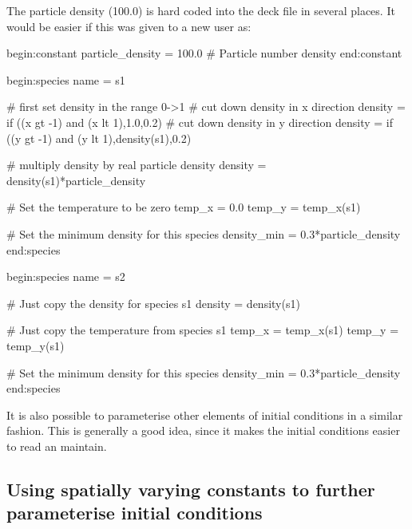The particle density (100.0) is hard coded into the deck file in several
places. It would be easier if this was given to a new user as:
\begin{boxverbatim}
begin:constant
   particle_density = 100.0 # Particle number density
end:constant

begin:species
   name = s1

   # first set density in the range 0->1
   # cut down density in x direction
   density = if ((x gt -1) and (x lt 1),1.0,0.2)
   # cut down density in y direction
   density = if ((y gt -1) and (y lt 1),density(s1),0.2)

   # multiply density by real particle density
   density = density(s1)*particle_density

   # Set the temperature to be zero
   temp_x = 0.0
   temp_y = temp_x(s1)

   # Set the minimum density for this species
   density_min = 0.3*particle_density
end:species

begin:species
   name = s2

   # Just copy the density for species s1
   density = density(s1)

   # Just copy the temperature from species s1
   temp_x = temp_x(s1)
   temp_y = temp_y(s1)

   # Set the minimum density for this species
   density_min = 0.3*particle_density
end:species
\end{boxverbatim}

It is also possible to parameterise other elements of initial conditions in a
similar fashion. This is generally a good idea, since it makes the
initial conditions easier to read an maintain.

\subsection{Using spatially varying constants to further parameterise
  initial conditions}

